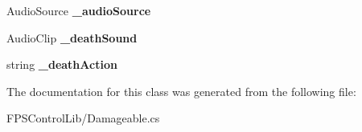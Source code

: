 \begin{DoxyCompactItemize}
\item 
\hypertarget{class_f_p_s_control_1_1_damageable_a7c6dcf23039832f9c2d71f0bcba55ad2}{Audio\-Source {\bfseries \-\_\-audio\-Source}}\label{class_f_p_s_control_1_1_damageable_a7c6dcf23039832f9c2d71f0bcba55ad2}

\item 
\hypertarget{class_f_p_s_control_1_1_damageable_af37e33071b49b88a35f36d3a1a0c40aa}{Audio\-Clip {\bfseries \-\_\-death\-Sound}}\label{class_f_p_s_control_1_1_damageable_af37e33071b49b88a35f36d3a1a0c40aa}

\item 
\hypertarget{class_f_p_s_control_1_1_damageable_a07898a4770cd42ef84963edbf83dba79}{string {\bfseries \-\_\-death\-Action}}\label{class_f_p_s_control_1_1_damageable_a07898a4770cd42ef84963edbf83dba79}

\end{DoxyCompactItemize}


The documentation for this class was generated from the following file\-:\begin{DoxyCompactItemize}
\item 
F\-P\-S\-Control\-Lib/Damageable.\-cs\end{DoxyCompactItemize}
